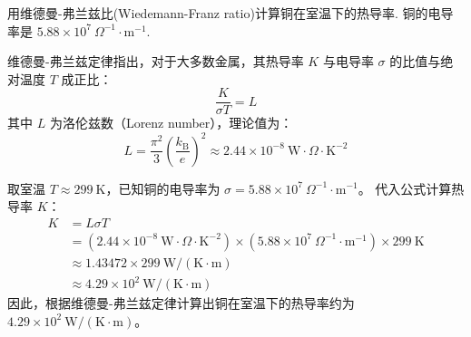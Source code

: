 \begin{exercise}\label{ex:28.5}
用维德曼-弗兰兹比(Wiedemann-Franz ratio)计算铜在室温下的热导率. 铜的电导率是 $5.88 \times 10^7 \ \Omega^{-1}\cdot\mathrm{m}^{-1}$.
\end{exercise}
\begin{solution}
维德曼-弗兰兹定律指出，对于大多数金属，其热导率 $K$ 与电导率 $\sigma$ 的比值与绝对温度 $T$ 成正比：
$$ \frac{K}{\sigma T} = L $$
其中 $L$ 为洛伦兹数（Lorenz number），理论值为：
$$ L = \frac{\pi^2}{3} \left( \frac{k_{\mathrm{B}}}{e} \right)^2 \approx 2.44 \times 10^{-8} \ \mathrm{W}\cdot\Omega\cdot\mathrm{K}^{-2} $$

取室温 $T \approx 299 \ \mathrm{K}$，已知铜的电导率为 $\sigma = 5.88 \times 10^7 \ \Omega^{-1}\cdot\mathrm{m}^{-1}$。
代入公式计算热导率 $K$：
\begin{align*}
    K &= L \sigma T \\
      &= (2.44 \times 10^{-8} \ \mathrm{W}\cdot\Omega\cdot\mathrm{K}^{-2}) \times (5.88 \times 10^7 \ \Omega^{-1}\cdot\mathrm{m}^{-1}) \times 299 \ \mathrm{K} \\
      &\approx 1.43472 \times 299 \ \mathrm{W / (K \cdot m)} \\
      &\approx 4.29 \times 10^2 \ \mathrm{W / (K \cdot m)}
\end{align*}
因此，根据维德曼-弗兰兹定律计算出铜在室温下的热导率约为 $4.29 \times 10^2 \ \mathrm{W / (K \cdot m)}$。
\end{solution}

